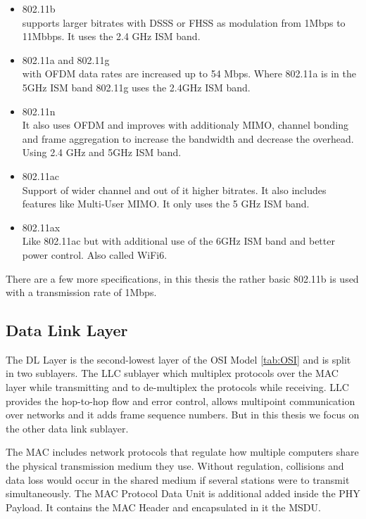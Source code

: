 \begin{itemize}
	\item 802.11b \\
	supports larger bitrates with \ac{DSSS} or \ac{FHSS} as modulation from 1Mbps to 11Mbbps.
	It uses the 2.4 GHz ISM band.
	\item 802.11a and 802.11g \\
	with \ac{OFDM} data rates are increased up to 54 Mbps.
	Where 802.11a is in the 5GHz ISM band 802.11g uses the 2.4GHz ISM band.
	\item 802.11n\\
	It also uses \ac{OFDM} and improves with additionaly \ac{MIMO}, channel bonding and frame aggregation to increase the bandwidth and decrease the overhead.
	Using 2.4 GHz and 5GHz ISM band.
	\item 802.11ac\\
	Support of wider channel and out of it higher bitrates. It also includes features like Multi-User MIMO.
	It only uses the 5 GHz ISM band.
	\item 802.11ax\\
	Like 802.11ac but with additional use of the 6GHz ISM band and better power control. 
	Also called WiFi6.
\end{itemize}

There are a few more specifications, in this thesis the rather basic 802.11b is used with a transmission rate of 1Mbps.

\subsection*{Data Link Layer}

The \ac{DL} Layer is the second-lowest layer of the \ac{OSI} Model \ref{tab:OSI} and is split in two sublayers. 
The \ac{LLC} sublayer which multiplex protocols over the MAC layer while transmitting and to de-multiplex the protocols while receiving.
LLC provides the hop-to-hop flow and error control, allows multipoint communication over networks 
and it adds frame sequence numbers.
But in this thesis we focus on the other data link sublayer.

The \ac{MAC} includes network protocols that regulate how multiple computers share the physical transmission medium they use. 
Without regulation, collisions and data loss would occur in the shared medium if several stations were to transmit simultaneously.
The \ac{MAC} Protocol Data Unit is additional added inside the \ac{PHY} Payload. 
It contains the \ac{MAC} Header and encapsulated in it the \ac{MSDU}.

